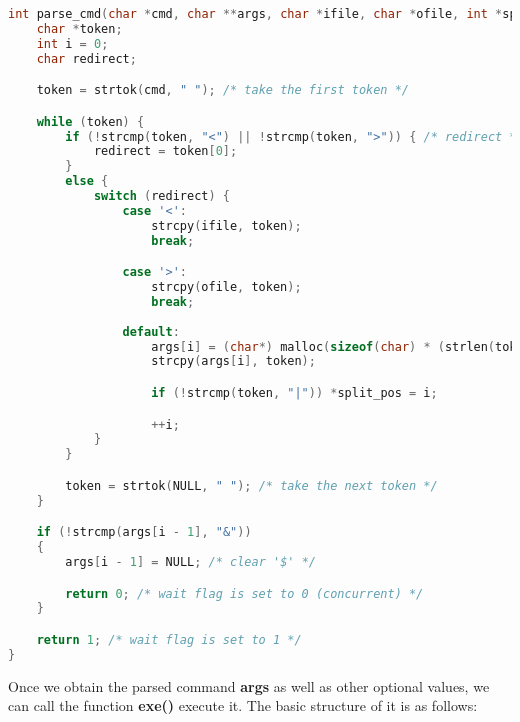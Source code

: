 \documentclass{article}
\begin{document}
\begin{lstlisting}[language=c]
int parse_cmd(char *cmd, char **args, char *ifile, char *ofile, int *split_pos) {
    char *token;
    int i = 0;
    char redirect;

    token = strtok(cmd, " "); /* take the first token */

    while (token) {
        if (!strcmp(token, "<") || !strcmp(token, ">")) { /* redirect */
            redirect = token[0];
        }
        else {
            switch (redirect) {
                case '<':
                    strcpy(ifile, token);
                    break;

                case '>':
                    strcpy(ofile, token);
                    break;
                
                default:
                    args[i] = (char*) malloc(sizeof(char) * (strlen(token)));
                    strcpy(args[i], token);

                    if (!strcmp(token, "|")) *split_pos = i;

                    ++i;
            }
        }

        token = strtok(NULL, " "); /* take the next token */
    }

    if (!strcmp(args[i - 1], "&")) 
    {
        args[i - 1] = NULL; /* clear '$' */

        return 0; /* wait flag is set to 0 (concurrent) */
    }

    return 1; /* wait flag is set to 1 */
}
\end{lstlisting}

Once we obtain the parsed command \textbf{args} as well as other optional values, we can call the function \textbf{exe()} execute it. The basic structure of it is as follows:
\end{document}
